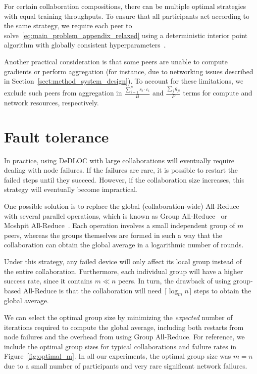 For certain collaboration compositions, there can be multiple optimal strategies with equal training throughputs. To ensure that all participants act according to the same strategy, we require each peer to solve~\eqref{eq:main_problem_appendix_relaxed} using a deterministic interior point algorithm with globally consistent hyperparameters~\cite{scipy}.

Another practical consideration is that some peers are unable to compute gradients or perform aggregation (for instance, due to networking issues described in Section~\ref{sect:method_system_design}). To account for these limitations, we exclude such peers from aggregation in $\frac{\sum_{i=1}^n s_i \cdot c_i }{B}$ and $\frac{\sum_{j} g_{j i}}{P}$ terms for compute and network resources, respectively.

\section{Fault tolerance}\label{appendix:groups}

In practice, using DeDLOC with large collaborations will eventually require dealing with node failures. If the failures are rare, it is possible to restart the failed steps until they succeed. However, if the collaboration size increases, this strategy will eventually become impractical.

One possible solution is to replace the global (collaboration-wide) All-Reduce with several parallel operations, which is known as Group All-Reduce~\cite{wagma} or Moshpit All-Reduce~\cite{moshpit}. Each operation involves a small independent group of $m$ peers, whereas the groups themselves are formed in such a way that the collaboration can obtain the global average in a logarithmic number of rounds.

Under this strategy, any failed device will only affect its local group instead of the entire collaboration. Furthermore, each individual group will have a higher success rate, since it contains $m\ll n$ peers. In turn, the drawback of using group-based All-Reduce is that the collaboration will need $\lceil\log_m n\rceil$ steps to obtain the global average.

We can select the optimal group size by minimizing the \textit{expected} number of iterations required to compute the global average, including both restarts from node failures and the overhead from using Group All-Reduce. For reference, we include the optimal group sizes for typical collaborations and failure rates in Figure~\ref{fig:optimal_m}. In all our experiments, the optimal group size was $m{=}n$ due to a small number of participants and very rare significant network failures.

